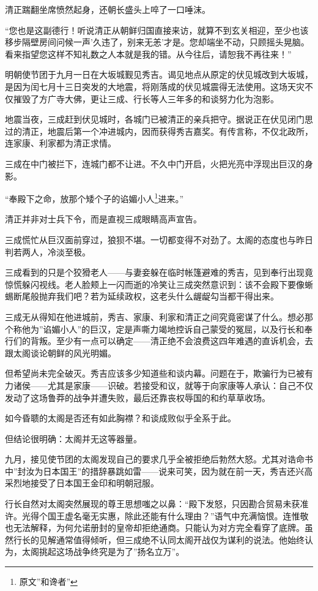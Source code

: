 \documentclass[
]{article}
\begin{document}
清正踹翻坐席愤然起身，还朝长盛头上啐了一口唾沫。

``您也是这副德行！听说清正从朝鲜归国直接来访，就算不到玄关相迎，至少也该移步隔壁房间问候一声'久违了，别来无恙'才是。您却端坐不动，只顾摇头晃脑。看来指望您这样不知礼数之人本就是我的错。从今往后，请恕我不再往来！''

明朝使节团于九月一日在大坂城觐见秀吉。谒见地点从原定的伏见城改到大坂城，是因为闰七月十三日突发的大地震，将刚落成的伏见城震得无法使用。这场天灾不仅摧毁了方广寺大佛，更让三成、行长等人三年多的和谈努力化为泡影。

地震当夜，三成赶到伏见城时，各城门已被清正的亲兵把守。据说正在伏见闭门思过的清正，地震后第一个冲进城内，因而获得秀吉嘉奖。有传言称，不仅北政所，连家康、利家都为清正求情。

三成在中门被拦下，连城门都不让进。不久中门开启，火把光亮中浮现出巨汉的身影。

``奉殿下之命，放那个矮个子的谄媚小人\footnote{原文''和谗者''}进来。''

清正并非对士兵下令，而是直视三成眼睛高声宣告。

三成慌忙从巨汉面前穿过，狼狈不堪。一切都变得不对劲了。太阁的态度也与昨日判若两人，冷淡至极。

三成看到的只是个狡猾老人------与妻妾躲在临时帐篷避难的秀吉，见到奉行出现竟惊慌躲闪视线。老人脸颊上一闪而逝的冷笑让三成突然意识到：该不会殿下要像蜥蜴断尾般抛弃我们吧？若为延续政权，这老头什么龌龊勾当都干得出来。

三成无从得知在他进城前，秀吉、家康、利家和清正之间究竟密谋了什么。想必那个称他为''谄媚小人''的巨汉，定是声嘶力竭地控诉自己蒙受的冤屈，以及行长和奉行们的背叛。至少有一点可以确定------清正绝不会浪费这四年难遇的直诉机会，去跟太阁谈论朝鲜的风光明媚。

但希望尚未完全破灭。秀吉应该多少知道些和谈内幕。问题在于，欺骗行为已被有力诸侯------尤其是家康------识破。若接受和议，就等于向家康等人承认：自己不仅发动了这场鲁莽的战争并遭失败，最后还靠丧权辱国的和约草草收场。

如今昏聩的太阁是否还有如此胸襟？和谈成败似乎全系于此。

但结论很明确：太阁并无这等器量。

九月，接见使节团的太阁发现自己的要求几乎全被拒绝后勃然大怒。尤其对诰命书中''封汝为日本国王''的措辞暴跳如雷------说来可笑，因为就在前一天，秀吉还兴高采烈地接受了日本国王金印和明朝冠服。

行长自然对太阁突然展现的尊王思想嗤之以鼻：``殿下发怒，只因勘合贸易未获准许。光得个国王虚名毫无实惠，除此还能有什么理由？''语气中充满恼恨。连惟敬也无法解释，为何允诺册封的皇帝却拒绝通商。只能认为对方完全看穿了底牌。虽然行长的见解通常值得倾听，但三成绝不认同太阁开战仅为谋利的说法。他始终认为，太阁挑起这场战争终究是为了''扬名立万''。
\end{document}
